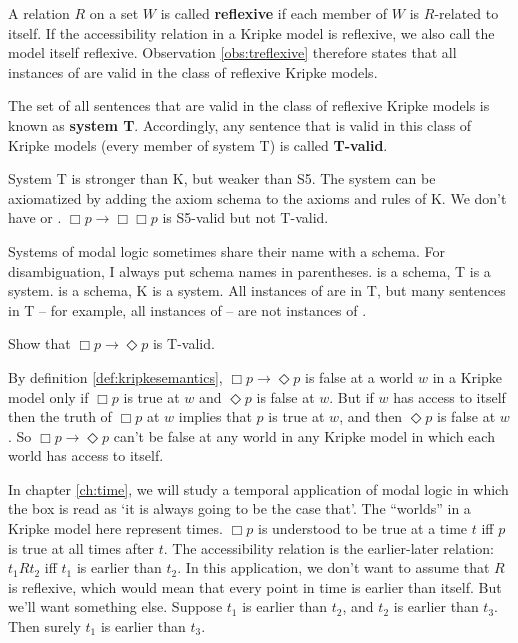 A relation $R$ on a set $W$ is called \textbf{reflexive} if each member of $W$
is $R$-related to itself. If the accessibility relation in a Kripke model is
reflexive, we also call the model itself reflexive. Observation
\ref{obs:treflexive} therefore states that all instances of 
are valid in the class of reflexive Kripke models.

The set of all sentences that are valid in the class of reflexive Kripke models
is known as \textbf{system T}. Accordingly, any sentence that is valid in this
class of Kripke models (every member of system T) is called \textbf{T-valid}.


System T is stronger than K, but weaker than S5. The system can be axiomatized
by adding the axiom schema  to the axioms and rules of K. We don't have
 or . $\Box p \to \Box \Box p$ is S5-valid but not T-valid.

Systems of modal logic sometimes share their name with a schema. For
disambiguation, I always put schema names in parentheses.  is a schema, T
is a system.  is a schema, K is a system. All instances of  are in
T, but many sentences in T -- for example, all instances of  -- are not
instances of .

\begin{exercise}
  Show that $\Box p \to \Diamond p$ is T-valid.
\end{exercise}
\begin{solution}
  By definition \ref{def:kripkesemantics}, $\Box p \to \Diamond p$ is false at a
  world $w$ in a Kripke model only if $\Box p$ is true at $w$ and $\Diamond p$
  is false at $w$. But if $w$ has access to itself then the truth of $\Box p$ at $w$ implies that $p$ is true at $w$, and then $\Diamond p$ is false at $w$. So $\Box p \to \Diamond p$ can't be false at any world in any Kripke model in which each world has access to itself.
\end{solution}

In chapter \ref{ch:time}, we will study a temporal application of modal
logic in which the box is read as `it is always going to be the case that'.
The ``worlds'' in a Kripke model here represent times. $\Box p$ is
understood to be true at a time $t$ iff $p$ is true at all times after $t$. The
accessibility relation is the earlier-later relation: $t_1Rt_2$ iff $t_1$ is
earlier than $t_2$. In this application, we don't want to assume that $R$ is
reflexive, which would mean that every point in time is earlier than itself.
But we'll want something else. Suppose $t_1$ is earlier than $t_2$, and $t_2$ is
earlier than $t_3$. Then surely $t_1$ is earlier than $t_3$. 


